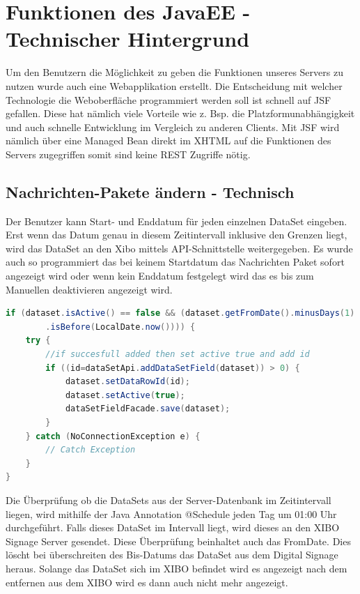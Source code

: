 \section{Funktionen des JavaEE - Technischer Hintergrund}
\label{sec:javaeetechnicalbackground}
Um den Benutzern die Möglichkeit zu geben die Funktionen unseres Servers zu nutzen wurde auch eine Webapplikation erstellt. Die Entscheidung mit welcher Technologie die Weboberfläche programmiert werden soll ist schnell auf JSF gefallen. Diese hat nämlich viele Vorteile wie z. Bsp. die Platzformunabhängigkeit und auch schnelle Entwicklung im Vergleich zu anderen Clients. Mit JSF wird nämlich über eine Managed Bean direkt im XHTML auf die Funktionen des Servers zugegriffen somit sind keine REST Zugriffe nötig.

\subsection{Nachrichten-Pakete ändern - Technisch}\label{sec:datasetexpiredatetechnical}
Der Benutzer kann Start- und Enddatum für jeden einzelnen DataSet eingeben. Erst wenn das Datum genau in diesem Zeitintervall inklusive den Grenzen liegt, wird das DataSet an den Xibo mittels API-Schnittstelle weitergegeben. Es wurde auch so programmiert das bei keinem Startdatum das Nachrichten Paket sofort angezeigt wird oder wenn kein Enddatum festgelegt wird das es bis zum Manuellen deaktivieren angezeigt wird.

\begin{lstlisting}[language=Java, caption={public void doCheckEvery24Hours()}]
if (dataset.isActive() == false && (dataset.getFromDate().minusDays(1)
        .isBefore(LocalDate.now()))) {
    try {
        //if succesfull added then set active true and add id
        if ((id=dataSetApi.addDataSetField(dataset)) > 0) {
            dataset.setDataRowId(id);
            dataset.setActive(true);
            dataSetFieldFacade.save(dataset);
        }
    } catch (NoConnectionException e) {
        // Catch Exception
    }
}
\end{lstlisting}

Die Überprüfung ob die DataSets aus der Server-Datenbank im Zeitintervall liegen, wird mithilfe der Java Annotation @Schedule jeden Tag um 01:00 Uhr durchgeführt. Falls dieses DataSet im Intervall liegt, wird dieses an den XIBO Signage Server gesendet. Diese Überprüfung beinhaltet auch das FromDate. Dies löscht bei überschreiten des Bis-Datums das DataSet aus dem Digital Signage heraus. Solange das DataSet sich im XIBO befindet wird es angezeigt nach dem entfernen aus dem XIBO wird es dann auch nicht mehr angezeigt.

